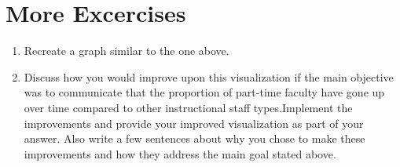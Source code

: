 \documentclass[
]{book}
\begin{document}
\hypertarget{more-excercises}{%
\section{More Excercises}\label{more-excercises}}

\begin{enumerate}
\def\labelenumi{\arabic{enumi}.}
\setcounter{enumi}{7}
\item
  Recreate a graph similar to the one above.
\item
  Discuss how you would improve upon this visualization if the main objective was to communicate that the proportion of part-time faculty have gone up over time compared to other instructional staff types.Implement the improvements and provide your improved visualization as part of your answer. Also write a few sentences about why you chose to make these improvements and how they address the main goal stated above.
\end{enumerate}

  
\end{document}
